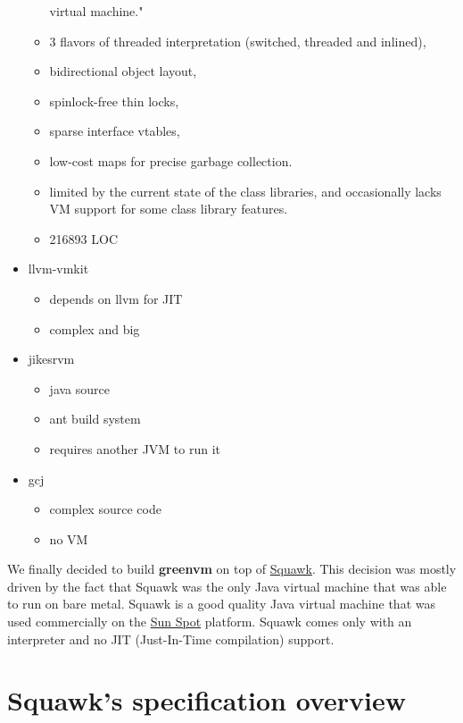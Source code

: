 \documentclass[
a4paper,
12pt,
]{report}
\newcommand{\gvm}{{\fontfamily{fco}\selectfont\textbf{\color{g}green\color{v}vm}}\xspace}
\newcommand{\java}{Java\texttrademark\xspace}
\begin{document}
\begin{itemize}
\begin{itemize}
     virtual machine."
  \item 3 flavors of threaded interpretation (switched, threaded and
     inlined),
  \item bidirectional object layout,
  \item spinlock-free thin locks,
  \item sparse interface vtables,
  \item low-cost maps for precise garbage collection.
  \item limited by the current state of the class libraries, and
    occasionally lacks VM support for some class library features.
  \item 216893 LOC
  \end{itemize}
\item llvm-vmkit
  \begin{itemize}
  \item depends on llvm for JIT
  \item complex and big
  \end{itemize}
\item jikesrvm
  \begin{itemize}
  \item java source
  \item ant build system
  \item requires another JVM to run it
  \end{itemize}
\item gcj
  \begin{itemize}
  \item complex source code
  \item no VM
  \end{itemize}
\end{itemize}


We finally decided to build \gvm on top of
\href{https://java.net/projects/squawk/pages/SquawkDevelopment}{Squawk}.
This decision was mostly driven by the fact that Squawk was the only
\java virtual machine that was able to run on bare metal.  Squawk is a
good quality \java virtual machine that was used commercially on the
\href{http://www.sunspotworld.com/}{Sun Spot} platform.  Squawk comes
only with an interpreter and no JIT (Just-In-Time compilation) support.

\section{Squawk's specification overview}
\end{document}
